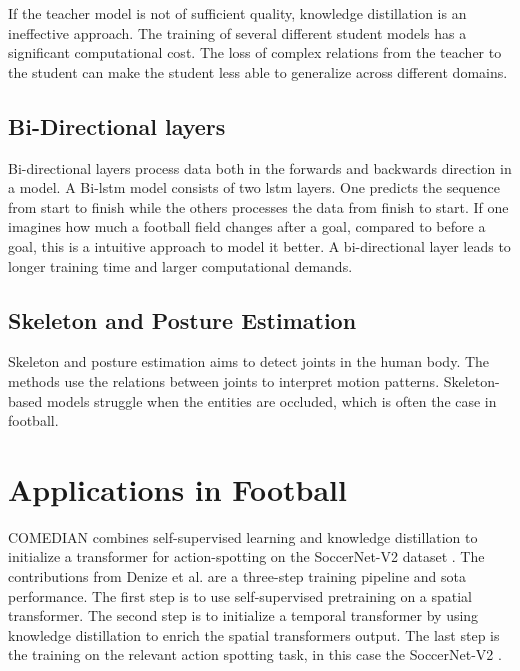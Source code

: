 If the teacher model is not of sufficient quality, knowledge distillation is an ineffective approach. The training of several different student models has a significant computational cost. The loss of complex relations from the teacher to the student can make the student less able to generalize across different domains.


\subsection{Bi-Directional layers}

Bi-directional layers process data both in the forwards and backwards direction in a model. A Bi-\acrshort{lstm} model \cite{radhakrishnan_bi_lstm_2023} \cite{bhogal_human_2023} consists of two \acrshort{lstm} layers. One predicts the sequence from start to finish while the others processes the data from finish to start. If one imagines how much a football field changes after a goal, compared to before a goal, this is a intuitive approach to model it better. A bi-directional layer leads to longer training time and larger computational demands. 


\subsection{Skeleton and Posture Estimation}

Skeleton and posture estimation \cite{elaoud_skeleton-based_2020} \cite{wang_skeleton_two-stream_2023} \cite{reilly__skeleton_just_pi_2023} aims to detect joints in the human body. The methods use the relations between joints to interpret motion patterns. Skeleton-based models struggle when the entities are occluded, which is often the case in football.

\section{Applications in Football}
\label{sec:applications_in_football}

COMEDIAN \cite{denize_comedian_2024} combines self-supervised learning and knowledge distillation to initialize a transformer for action-spotting on the SoccerNet-V2 dataset \cite{deliege_soccernet-v2_dataset_2021}. The contributions from Denize et al. are a three-step training pipeline and \acrshort{sota} performance. The first step is to use self-supervised pretraining on a spatial transformer. The second step is to initialize a temporal transformer by using knowledge distillation to enrich the spatial transformers output. The last step is the training on the relevant action spotting task, in this case the SoccerNet-V2 \cite{deliege_soccernet-v2_dataset_2021}.

